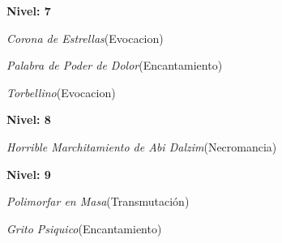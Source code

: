 \documentclass[a4paper,twocolumn,openany,10pt]{dndbook}
\begin{document}
\begin{list}{}{}
	\item \textbf{Nivel: 7}
	\begin{list}{}{}
		\item \textit{Corona de Estrellas}(Evocacion)
		\item \textit{Palabra de Poder de Dolor}(Encantamiento)
		\item \textit{Torbellino}(Evocacion)
	\end{list}

	\item \textbf{Nivel: 8}
	\begin{list}{}{}
		\item \textit{Horrible Marchitamiento de Abi Dalzim}(Necromancia)
	\end{list}

	\item \textbf{Nivel: 9}
	\begin{list}{}{}
		\item \textit{Polimorfar en Masa}(Transmutación)
		\item \textit{Grito Psiquico}(Encantamiento)
	\end{list}
\end{list}
\end{document}
